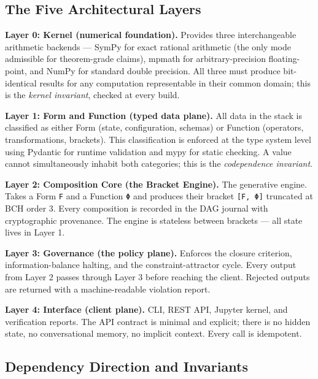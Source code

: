 \documentclass[11pt,a4paper]{article}
\begin{document}
\hypertarget{the-five-architectural-layers}{%
\subsection{The Five Architectural
Layers}\label{the-five-architectural-layers}}

\textbf{Layer 0: Kernel (numerical foundation).} Provides three
interchangeable arithmetic backends --- SymPy for exact rational
arithmetic (the only mode admissible for theorem-grade claims), mpmath
for arbitrary-precision floating-point, and NumPy for standard double
precision. All three must produce bit-identical results for any
computation representable in their common domain; this is the
\emph{kernel invariant}, checked at every build.

\textbf{Layer 1: Form and Function (typed data plane).} All data in the
stack is classified as either Form (state, configuration, schemas) or
Function (operators, transformations, brackets). This classification is
enforced at the type system level using Pydantic for runtime validation
and mypy for static checking. A value cannot simultaneously inhabit both
categories; this is the \emph{codependence invariant}.

\textbf{Layer 2: Composition Core (the Bracket Engine).} The generative
engine. Takes a Form \texttt{F} and a Function \texttt{Φ} and produces
their bracket \texttt{{[}F,\ Φ{]}} truncated at BCH order 3. Every
composition is recorded in the DAG journal with cryptographic
provenance. The engine is stateless between brackets --- all state lives
in Layer 1.

\textbf{Layer 3: Governance (the policy plane).} Enforces the closure
criterion, information-balance halting, and the constraint-attractor
cycle. Every output from Layer 2 passes through Layer 3 before reaching
the client. Rejected outputs are returned with a machine-readable
violation report.

\textbf{Layer 4: Interface (client plane).} CLI, REST API, Jupyter
kernel, and verification reports. The API contract is minimal and
explicit; there is no hidden state, no conversational memory, no
implicit context. Every call is idempotent.

\hypertarget{dependency-direction-and-invariants}{%
\subsection{Dependency Direction and
Invariants}\label{dependency-direction-and-invariants}}
\end{document}
